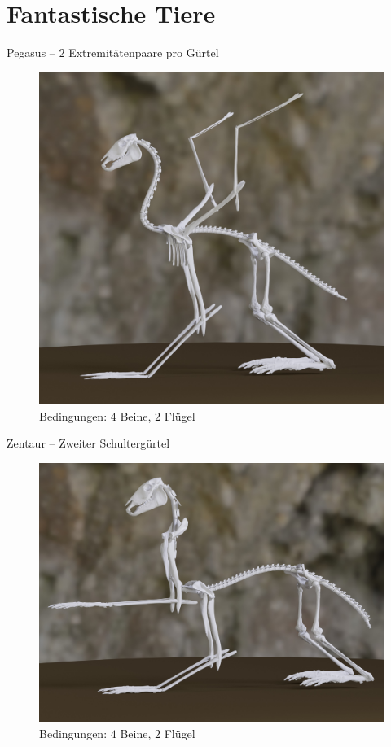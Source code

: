 \documentclass{beamer}
\begin{document}
\section{Fantastische Tiere}

\begin{frame}{Pegasus -- $2$ Extremitätenpaare pro Gürtel}
 \begin{figure}
  \centering
  \includegraphics[height=0.75\textheight]{../../java_skeleton_generation/example_skeletons/pegasus.jpg}
  \caption{Bedingungen: $4$ Beine, $2$ Flügel}
 \end{figure}
\end{frame}

\begin{frame}{Zentaur -- Zweiter Schultergürtel}
 \begin{figure}
  \centering
  \includegraphics[height=0.75\textheight]{../../java_skeleton_generation/example_skeletons/zentaur2.jpg}
  \caption{Bedingungen: $4$ Beine, $2$ Flügel}
 \end{figure}
\end{frame}
\end{document}
